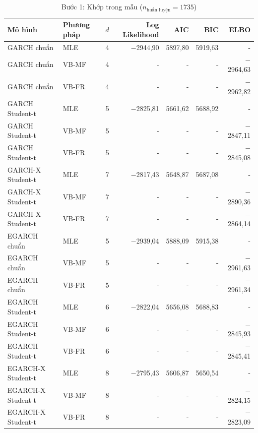 \documentclass[11pt,a4paper]{article}
\begin{document}
\begin{table}[H]\centering\footnotesize
\caption{Bước 1: Khớp trong mẫu ($n_{\text{huấn luyện}}=1735$)}\label{tab:b1-trong-mau}
\begin{tabular}{l l r r r r r}
\toprule
\textbf{Mô hình} & \textbf{Phương pháp} & $d$ & \textbf{Log Likelihood} & \textbf{AIC} & \textbf{BIC} & \textbf{ELBO} \\
\midrule
GARCH chuẩn & MLE & 4 & $-$2944,90 & 5897,80 & 5919,63 & - \\
GARCH chuẩn & VB-MF & 4 & - & - & - & $-$2964,63 \\
GARCH chuẩn & VB-FR & 4 & - & - & - & $-$2962,82 \\
GARCH Student-t & MLE & 5 & $-$2825,81 & 5661,62 & 5688,92 & - \\
GARCH Student-t & VB-MF & 5 & - & - & - & $-$2847,11 \\
GARCH Student-t & VB-FR & 5 & - & - & - & $-$2845,08 \\
GARCH-X Student-t & MLE & 7 & $-$2817,43 & 5648,87 & 5687,08 & - \\
GARCH-X Student-t & VB-MF & 7 & - & - & - & $-$2890,36 \\
GARCH-X Student-t & VB-FR & 7 & - & - & - & $-$2864,14 \\
EGARCH chuẩn & MLE & 5 & $-$2939,04 & 5888,09 & 5915,38 & - \\
EGARCH chuẩn & VB-MF & 5 & - & - & - & $-$2961,63 \\
EGARCH chuẩn & VB-FR & 5 & - & - & - & $-$2961,34 \\
EGARCH Student-t & MLE & 6 & $-$2822,04 & 5656,08 & 5688,83 & - \\
EGARCH Student-t & VB-MF & 6 & - & - & - & $-$2845,93 \\
EGARCH Student-t & VB-FR & 6 & - & - & - & $-$2845,41 \\
EGARCH-X Student-t & MLE & 8 & $-$2795,43 & 5606,87 & 5650,54 & - \\
EGARCH-X Student-t & VB-MF & 8 & - & - & - & $-$2824,15 \\
EGARCH-X Student-t & VB-FR & 8 & - & - & - & $-$2823,09 \\
\bottomrule
\end{tabular}
\end{table}
\end{document}
